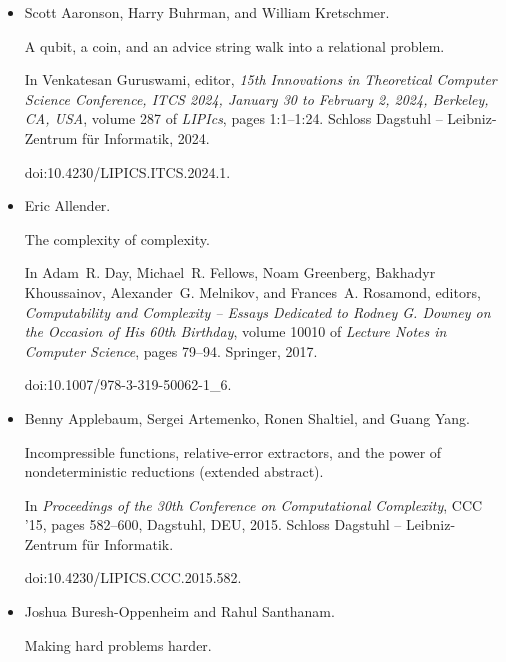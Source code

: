 \documentclass[10pt,a4paper]{article}
\begin{document}
\begin{itemize}


\item[] 
[1]

Scott Aaronson, Harry Buhrman, and William Kretschmer.


A qubit, a coin, and an advice string walk into a relational problem.


In Venkatesan Guruswami, editor, \emph{15th Innovations in Theoretical
Computer Science Conference, ITCS 2024, January 30 to February 2, 2024,
Berkeley, CA, USA}, volume 287 of \emph{LIPIcs}, pages 1:1–1:24. Schloss
Dagstuhl – Leibniz-Zentrum für Informatik, 2024.


doi:10.4230/LIPICS.ITCS.2024.1.





\item[] 
[2]

Eric Allender.


The complexity of complexity.


In Adam R. Day, Michael R. Fellows, Noam Greenberg, Bakhadyr
Khoussainov, Alexander G. Melnikov, and Frances A. Rosamond, editors, \emph{Computability and Complexity – Essays Dedicated to Rodney G. Downey on the
Occasion of His 60th Birthday}, volume 10010 of \emph{Lecture Notes in
Computer Science}, pages 79–94. Springer, 2017.


doi:10.1007/978-3-319-50062-1\_6.





\item[] 
[3]

Benny Applebaum, Sergei Artemenko, Ronen Shaltiel, and Guang Yang.


Incompressible functions, relative-error extractors, and the power of
nondeterministic reductions (extended abstract).


In \emph{Proceedings of the 30th Conference on Computational
Complexity}, CCC ’15, pages 582–600, Dagstuhl, DEU, 2015. Schloss Dagstuhl
– Leibniz-Zentrum für Informatik.


doi:10.4230/LIPICS.CCC.2015.582.





\item[] 
[4]

Joshua Buresh-Oppenheim and Rahul Santhanam.


Making hard problems harder.



\end{itemize}
\end{document}
